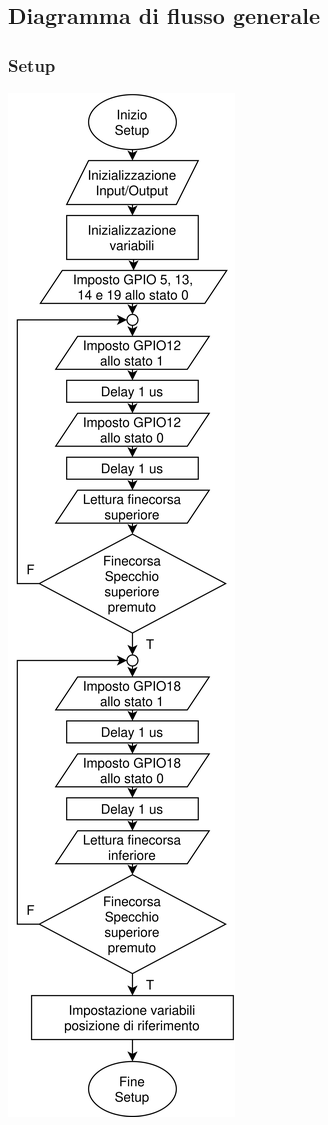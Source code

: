 \documentclass[12pt]{article}
\begin{document}
    \subsection{Diagramma di flusso generale}
        \subsubsection{Setup}
            \begin{center}
                \includegraphics[height=\textheight-150pt]{Draws/Flowchart/Setup.png}
                \label{setup_flowchart}
            \end{center}
        
\end{document}
